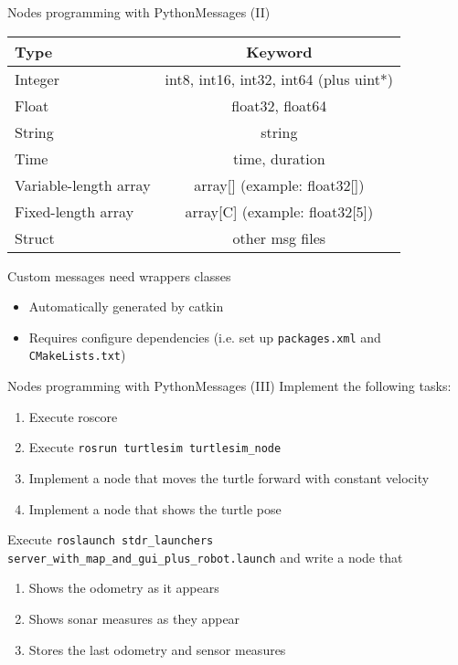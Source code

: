\documentclass[10pt,compress]{beamer} %
\begin{document}
\begin{frame}[fragile]{Nodes programming with Python}{Messages (II)}
	\vspace{-0.8cm}
	\begin{center}
	\begin{tabular}{lc} \hline
	  {\sc Type} & {\sc Keyword}\\ \hline
	Integer & int8, int16, int32, int64 (plus uint*)\\
	Float & float32, float64\\
	String & string\\
	Time & time, duration\\
	Variable-length array &  array[] (example: float32[])\\
	Fixed-length array	 & array[C] (example: float32[5])\\
	Struct & other msg files\\
	  \hline  
	\end{tabular}
	\end{center}
	\vspace{-0.2cm}
	Custom messages need wrappers classes
	\begin{itemize}
		\item Automatically generated by catkin
		\item Requires configure dependencies (i.e. set up \texttt{packages.xml} and \texttt{CMakeLists.txt})
	\end{itemize}
\end{frame}

\begin{frame}[fragile]{Nodes programming with Python}{Messages (III)}
	Implement the following tasks:
	\begin{enumerate}
		\item Execute roscore
		\item Execute \texttt{rosrun turtlesim turtlesim\_node}
		\item Implement a node that moves the turtle forward with constant velocity
		\item Implement a node that shows the turtle pose
	\end{enumerate}
	Execute \texttt{roslaunch stdr\_launchers server\_with\_map\_and\_gui\_plus\_robot.launch} and write a node that
	\begin{enumerate}
		\item Shows the odometry as it appears
		\item Shows sonar measures as they appear
		\item Stores the last odometry and sensor measures
	\end{enumerate}

\end{frame}
\end{document}
